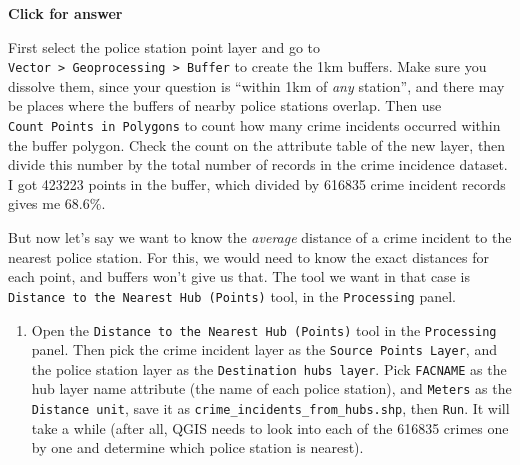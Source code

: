 \documentclass[
  letterpaper,
  DIV=11,
  numbers=noendperiod]{scrreprt}
\providecommand{\tightlist}{%
  \setlength{\itemsep}{0pt}\setlength{\parskip}{0pt}}\usepackage{longtable,booktabs,array}
\begin{document}
\begin{tcolorbox}[enhanced jigsaw, toprule=.15mm, breakable, left=2mm, colframe=quarto-callout-important-color-frame, colback=white, arc=.35mm, leftrule=.75mm, opacityback=0, rightrule=.15mm, bottomrule=.15mm]

\vspace{-3mm}\textbf{Click for answer}\vspace{3mm}

First select the police station point layer and go to
\texttt{Vector\ \textgreater{}\ Geoprocessing\ \textgreater{}\ Buffer}
to create the 1km buffers. Make sure you dissolve them, since your
question is ``within 1km of \emph{any} station'', and there may be
places where the buffers of nearby police stations overlap. Then use
\texttt{Count\ Points\ in\ Polygons} to count how many crime incidents
occurred within the buffer polygon. Check the count on the attribute
table of the new layer, then divide this number by the total number of
records in the crime incidence dataset. I got 423223 points in the
buffer, which divided by 616835 crime incident records gives me 68.6\%.

\end{tcolorbox}

But now let's say we want to know the \emph{average} distance of a crime
incident to the nearest police station. For this, we would need to know
the exact distances for each point, and buffers won't give us that. The
tool we want in that case is
\texttt{Distance\ to\ the\ Nearest\ Hub\ (Points)} tool, in the
\texttt{Processing} panel.

\begin{enumerate}
\def\labelenumi{(\arabic{enumi})}
\setcounter{enumi}{346}
\tightlist
\item
  Open the \texttt{Distance\ to\ the\ Nearest\ Hub\ (Points)} tool in
  the \texttt{Processing} panel. Then pick the crime incident layer as
  the \texttt{Source\ Points\ Layer}, and the police station layer as
  the \texttt{Destination\ hubs\ layer}. Pick \texttt{FACNAME} as the
  hub layer name attribute (the name of each police station), and
  \texttt{Meters} as the \texttt{Distance\ unit}, save it as
  \texttt{crime\_incidents\_from\_hubs.shp}, then \texttt{Run}. It will
  take a while (after all, QGIS needs to look into each of the 616835
  crimes one by one and determine which police station is nearest).
\end{enumerate}
\end{document}
